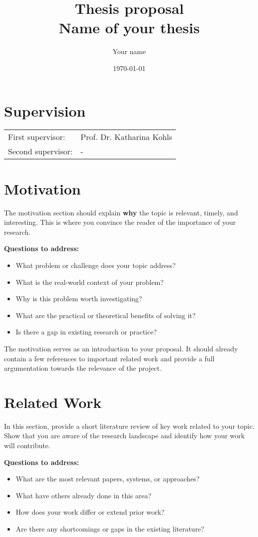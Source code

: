 \documentclass{article}
\title{Thesis proposal\\
 \large Name of your thesis}
\author{Your name}
\date{\today}
\begin{document}
\maketitle

\section*{Supervision}
\begin{tabular}{ l l }
	First supervisor: & Prof. Dr. Katharina Kohls \\ 
	Second supervisor: & -  \\  
\end{tabular}

\section*{Motivation}
The motivation section should explain \textbf{why} the topic is relevant, timely, and interesting. This is where you convince the reader of the importance of your research.

\textbf{Questions to address:}
\begin{itemize}[label=--]
	\item What problem or challenge does your topic address?
  	\item What is the real-world context of your problem?
	\item Why is this problem worth investigating?
	\item What are the practical or theoretical benefits of solving it?
	\item Is there a gap in existing research or practice?
\end{itemize}

The motivation serves as an introduction to your proposal. It should already contain a few references to important related work and provide a full argumentation towards the relevance of the project.

\section*{Related Work}
In this section, provide a short literature review of key work related to your topic. Show that you are aware of the research landscape and identify how your work will contribute.

\textbf{Questions to address:}
\begin{itemize}[label=--]
  \item What are the most relevant papers, systems, or approaches?
  \item What have others already done in this area?
  \item How does your work differ or extend prior work?
  \item Are there any shortcomings or gaps in the existing literature?
\end{itemize}
\end{document}
